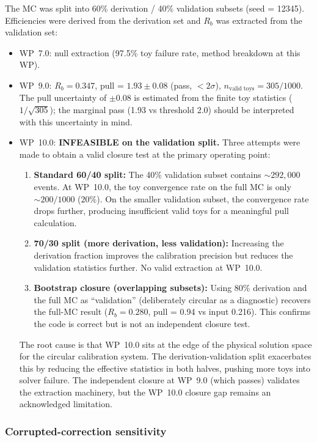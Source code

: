 \documentclass[11pt,a4paper]{article}
\begin{document}
The MC was split into 60\% derivation / 40\% validation subsets (seed = 12345).
Efficiencies were derived from the derivation set and $R_b$ was extracted from the
validation set:
\begin{itemize}
\item WP~7.0: null extraction (97.5\% toy failure rate, method breakdown at this WP).
\item WP~9.0: $R_b = 0.347$, pull = $1.93 \pm 0.08$ (pass, $< 2\sigma$),
$n_\mathrm{valid\;toys} = 305/1000$. The pull uncertainty of $\pm 0.08$ is estimated
from the finite toy statistics ($1/\sqrt{305}$); the marginal pass (1.93 vs threshold
2.0) should be interpreted with this uncertainty in mind.
\item WP~10.0: \textbf{INFEASIBLE on the validation split.}
Three attempts were made to obtain a valid closure test at the primary operating point:
\begin{enumerate}
\item \textbf{Standard 60/40 split:} The 40\% validation subset contains
$\sim 292{,}000$ events. At WP~10.0, the toy convergence rate on the full MC is
only $\sim 200/1000$ ($20\%$). On the smaller validation subset, the convergence
rate drops further, producing insufficient valid toys for a meaningful pull
calculation.
\item \textbf{70/30 split (more derivation, less validation):} Increasing the
derivation fraction improves the calibration precision but reduces the validation
statistics further. No valid extraction at WP~10.0.
\item \textbf{Bootstrap closure (overlapping subsets):} Using 80\% derivation and
the full MC as ``validation'' (deliberately circular as a diagnostic) recovers the
full-MC result ($R_b = 0.280$, pull = 0.94 vs input 0.216). This confirms the code
is correct but is not an independent closure test.
\end{enumerate}
The root cause is that WP~10.0 sits at the edge of the physical solution space for
the circular calibration system. The derivation-validation split exacerbates this by
reducing the effective statistics in both halves, pushing more toys into solver failure.
The independent closure at WP~9.0 (which passes) validates the extraction machinery,
but the WP~10.0 closure gap remains an acknowledged limitation.
\end{itemize}

\subsubsection{Corrupted-correction sensitivity}
\end{document}

